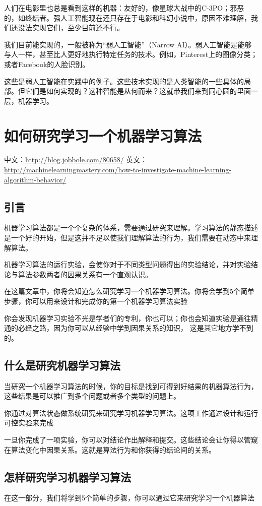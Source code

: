 \documentclass[a4paper,12pt]{ctexbook}
\begin{document}
人们在电影里也总是看到这样的机器：友好的，像星球大战中的C-3PO；邪恶的，如终结者。强人工智能现在还只存在于电影和科幻小说中，原因不难理解，我们还没法实现它们，至少目前还不行。

我们目前能实现的，一般被称为“弱人工智能”（Narrow AI）。弱人工智能是能够与人一样，甚至比人更好地执行特定任务的技术。例如，Pinterest上的图像分类；或者Facebook的人脸识别。

这些是弱人工智能在实践中的例子。这些技术实现的是人类智能的一些具体的局部。但它们是如何实现的？这种智能是从何而来？这就带我们来到同心圆的里面一层，机器学习。


\chapter{如何研究学习一个机器学习算法}
中文：\url{http://blog.jobbole.com/80658/}
英文：\url{http://machinelearningmastery.com/how-to-investigate-machine-learning-algorithm-behavior/}
\section{引言}
机器学习算法都是一个个复杂的体系，需要通过研究来理解。学习算法的静态描述是一个好的开始，但是这并不足以使我们理解算法的行为，我们需要在动态中来理解算法。

机器学习算法的运行实验，会使你对于不同类型问题得出的实验结论，并对实验结论与算法参数两者的因果关系有一个直观认识。

在这篇文章中，你将会知道怎么研究学习一个机器学习算法。你将会学到5个简单步骤，你可以用来设计和完成你的第一个机器学习算法实验

你会发现机器学习实验不光是学者们的专利，你也可以；你也会知道实验是通往精通的必经之路，因为你可以从经验中学到因果关系的知识， 这是其它地方学不到的。

\section{什么是研究机器学习算法}
当研究一个机器学习算法的时候，你的目标是找到可得到好结果的机器算法行为，这些结果是可以推广到多个问题或者多个类型的问题上。

你通过对算法状态做系统研究来研究学习机器学习算法。这项工作通过设计和运行可控实验来完成

一旦你完成了一项实验，你可以对结论作出解释和提交。这些结论会让你得以管窥在算法变化中因果关系。这就是算法行为和你获得的结论间的关系。

\section{怎样研究学习机器学习算法}
在这一部分，我们将学到5个简单的步骤，你可以通过它来研究学习一个机器算法
\end{document}
